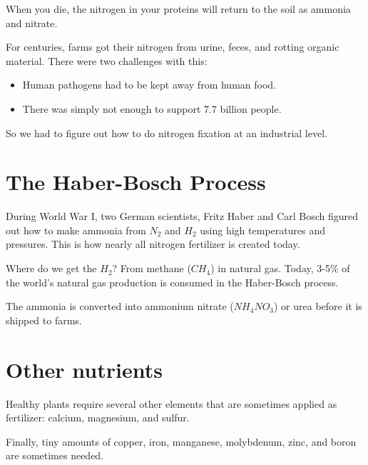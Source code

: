 When you die, the nitrogen in your proteins will return to the soil as
ammonia and nitrate.

For centuries, farms got their nitrogen from urine, feces, and rotting
organic material. There were two challenges with this:
\begin{itemize}
\item Human pathogens had to be kept away from human food.
\item There was simply not enough to support 7.7 billion people.
\end{itemize}

So we had to figure out how to do nitrogen fixation at an industrial
level.

\section{The Haber-Bosch Process}

During World War I, two German scientists, Fritz Haber and Carl Bosch
figured out how to make ammonia from $N_2$ and $H_2$ using high
temperatures and pressures. This is how nearly all nitrogen fertilizer
is created today.

Where do we get the $H_2$? From methane ($CH_4$) in natural gas. Today, 3-5\%
of the world's natural gas production is consumed in the Haber-Bosch
process.

The ammonia is converted into ammonium nitrate ($NH_4NO_3$) or urea
before it is shipped to farms.

\section{Other nutrients}

Healthy plants require several other elements that are sometimes
applied as fertilizer: calcium, magnesium, and sulfur.

Finally, tiny amounts of copper, iron, manganese, molybdenum, zinc, and
boron are sometimes needed.
